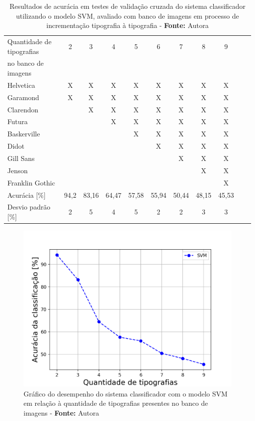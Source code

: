 
\begin{table}[h]
 \centering
 \begin{tabular}{l|c|c|c|c|c|c|c|c|c|c}
    Quantidade de tipografias  & 2 & 3 & 4 & 5 & 6 & 7 & 8 & 9\\ no banco de imagens & & & & & & & & \\
	\hline
	Helvetica & X & X & X & X & X & X & X & X   \\
	Garamond & X & X & X & X & X & X & X & X  \\
	Clarendon &  & X & X & X & X & X & X & X    \\
	Futura &  &  & X & X & X & X & X & X  \\
	Baskerville &  &  &  & X & X & X & X & X    \\
	Didot &  &  &  &  & X & X & X & X    \\
	Gill Sans &  &  &  &  &  & X & X & X   \\
	Jenson &  &  &  &  &  &  & X & X  \\
	Franklin Gothic &  &  &  &  &  &  &  & X  \\
	\hline
	Acurácia [\%] & 94,2 & 83,16 & 64,47 & 57,58 & 55,94 & 50,44 & 48,15 & 45,53 \\
	Desvio padrão [\%] & 2 & 5 & 4 & 5 & 2 & 2 & 3 & 3\\
 \end{tabular}
 \caption{Resultados de acurácia em testes de validação cruzada do sistema classificador utilizando o modelo SVM, avaliado com banco de imagens em processo de incrementação tipografia à tipografia - \textbf{Fonte:} Autora}
 \label{tab:svmResults}
\end{table}


\begin{figure}[H]
 \centering
  \includegraphics[width=0.7\linewidth]{figuras/graficosvm.pdf}
  \caption{Gráfico do desempenho do sistema classificador com o modelo SVM em relação à quantidade de tipografias presentes no banco de imagens - \textbf{Fonte:} Autora}
  \label{fig:graficoSVM}
\end{figure}

